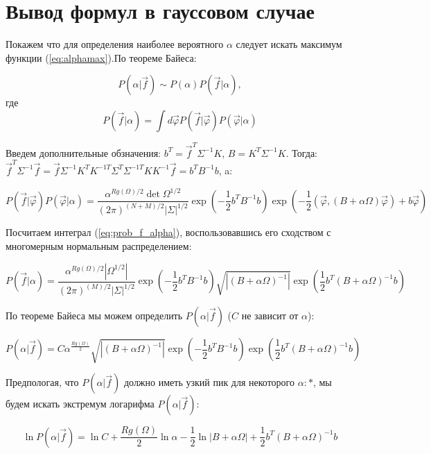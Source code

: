 \chapter{Вывод формул в гауссовом случае} \label{sec:gauss}

Покажем что для определения наиболее вероятного $\alpha$ следует искать максимум функции (\ref{eq:alphamax}).По теореме Байеса:

\begin{equation}
	P(\alpha|\vec{f}) \sim P(\alpha)P(\vec{f}|\alpha),
\end{equation}
где
\begin{equation}
	\label{eq:prob_f_alpha}
	P(\vec{f}|\alpha) = \int d\vec{\varphi} P(\vec{f}|\vec{\varphi})P(\vec{\varphi}|\alpha)
\end{equation}

Введем дополнительные обзначения: $b^T = \vec{f}^T\Sigma^{-1}K$, $B = K^T\Sigma^{-1}K$.
Тогда: $\vec{f}^T\Sigma^{-1}\vec{f} = \vec{f}\Sigma^{-1}K^{T}K^{-1T}\Sigma^{T}\Sigma^{-1T} KK^{-1}\vec{f} = b^{T}B^{-1}b$, a:

\begin{equation}
	\label{eq:aposteoriphi}
	P(\vec{f}|\vec{\varphi})P(\vec{\varphi}|\alpha) = \frac{\alpha^{Rg(\Omega)/2}\det\Omega^{1/2}}{(2\pi)^{(N+M)/2}|\Sigma|^{1/2}}\exp(-\frac{1}{2}b^{T}B^{-1}b) \exp(-\frac{1}{2} (\vec{\varphi},(B+\alpha\Omega)\vec{\varphi}) + b\vec{\varphi})
\end{equation}

Посчитаем интеграл (\ref{eq:prob_f_alpha}), воспользовавшись его сходством с многомерным нормальным распределением:

\begin{equation}
	P(\vec{f}|\alpha) = \frac{\alpha^{Rg(\Omega)/2}|\Omega^{1/2}|}{(2\pi)^{(M)/2}|\Sigma|^{1/2}}\exp(-\frac{1}{2}b^{T}B^{-1}b) \sqrt{|(B+\alpha\Omega)^{-1}|}\exp(\frac{1}{2}b^{T}(B+\alpha\Omega)^{-1}b)
\end{equation}

По теореме Байеса мы можем определить $P(\alpha|\vec{f})$ ($C$ не зависит от $\alpha$):

\begin{equation}
	\label{eq:alphaaposter}
	P(\alpha|\vec{f}) = C \alpha^{\frac{Rg(\Omega)}{2}}\sqrt{|(B+\alpha\Omega)^{-1}|}\exp(-\frac{1}{2}b^{T}B^{-1}b)\exp(\frac{1}{2}b^{T}(B+\alpha\Omega)^{-1}b)
\end{equation}

Предпологая, что $P(\alpha|\vec{f})$ должно иметь узкий пик для некоторого $\alpha:*$, мы будем искать экстремум логарифма $P(\alpha|\vec{f})$:

\begin{equation}
	\ln{P(\alpha|\vec{f})} = \ln{C} + \frac{Rg(\Omega)}{2}\ln{\alpha} - \frac{1}{2}\ln{|B+\alpha\Omega|}  + \frac{1}{2}b^{T}(B+\alpha\Omega)^{-1}b
\end{equation}